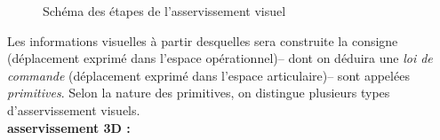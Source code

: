 \begin{figure}[htp]
  \centering
    \def\svgwidth{.95\linewidth}
  
    \caption{\footnotesize{Schéma des étapes de l'asservissement visuel}}
\label{chap01:fig05}
\end{figure}

Les informations visuelles \`a partir desquelles sera construite la consigne (d\'eplacement exprim\'e dans l'espace op\'erationnel)-- dont on d\'eduira une {\it loi de commande} (d\'eplacement exprim\'e dans l'espace articulaire)-- sont appel\'ees {\it primitives}. Selon la nature des primitives, on distingue plusieurs types d'asservissement visuels.\\

{\bf asservissement 3D :}\\


